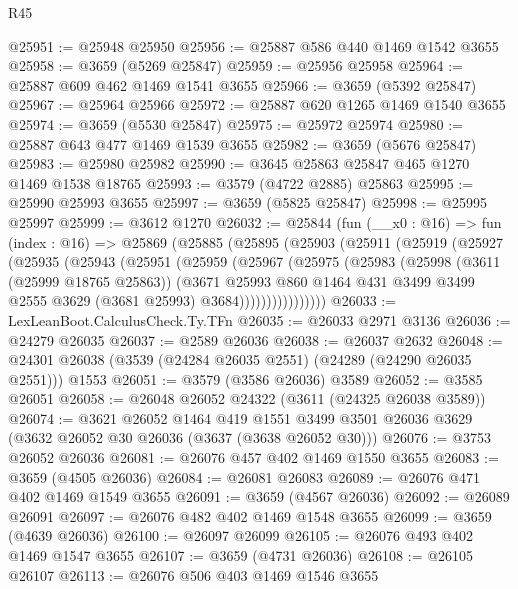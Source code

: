 \begin{lexlean}{R45}
\begin{coremodule}
@25951 := @25948 @25950
@25956 := @25887 @586 @440 @1469 @1542 @3655
@25958 := @3659 (@5269 @25847)
@25959 := @25956 @25958
@25964 := @25887 @609 @462 @1469 @1541 @3655
@25966 := @3659 (@5392 @25847)
@25967 := @25964 @25966
@25972 := @25887 @620 @1265 @1469 @1540 @3655
@25974 := @3659 (@5530 @25847)
@25975 := @25972 @25974
@25980 := @25887 @643 @477 @1469 @1539 @3655
@25982 := @3659 (@5676 @25847)
@25983 := @25980 @25982
@25990 := @3645 @25863 @25847 @465 @1270 @1469 @1538 @18765
@25993 := @3579 (@4722 @2885) @25863
@25995 := @25990 @25993 @3655
@25997 := @3659 (@5825 @25847)
@25998 := @25995 @25997
@25999 := @3612 @1270
@26032 := @25844
    (fun (__x0 : @16) =>
    fun (index : @16) =>
    @25869
      (@25885
        (@25895
          (@25903
            (@25911
              (@25919
                (@25927
                  (@25935
                    (@25943
                      (@25951
                        (@25959
                          (@25967
                            (@25975
                              (@25983
                                (@25998
                                  (@3611 (@25999 @18765 @25863))
                                  (@3671
                                    @25993
                                    @860
                                    @1464
                                    @431
                                    @3499
                                    @3499
                                    @2555
                                    @3629
                                    (@3681 @25993)
                                    @3684))))))))))))))))
@26033 := LexLeanBoot.CalculusCheck.Ty.TFn
@26035 := @26033 @2971 @3136
@26036 := @24279 @26035
@26037 := @2589 @26036
@26038 := @26037 @2632
@26048 := @24301 @26038 (@3539 (@24284 @26035 @2551) (@24289 (@24290 @26035 @2551))) @1553
@26051 := @3579 (@3586 @26036) @3589
@26052 := @3585 @26051
@26058 := @26048 @26052 @24322 (@3611 (@24325 @26038 @3589))
@26074 := @3621
    @26052
    @1464
    @419
    @1551
    @3499
    @3501
    @26036
    @3629
    (@3632 @26052 @30 @26036 (@3637 (@3638 @26052 @30)))
@26076 := @3753 @26052 @26036
@26081 := @26076 @457 @402 @1469 @1550 @3655
@26083 := @3659 (@4505 @26036)
@26084 := @26081 @26083
@26089 := @26076 @471 @402 @1469 @1549 @3655
@26091 := @3659 (@4567 @26036)
@26092 := @26089 @26091
@26097 := @26076 @482 @402 @1469 @1548 @3655
@26099 := @3659 (@4639 @26036)
@26100 := @26097 @26099
@26105 := @26076 @493 @402 @1469 @1547 @3655
@26107 := @3659 (@4731 @26036)
@26108 := @26105 @26107
@26113 := @26076 @506 @403 @1469 @1546 @3655

\end{coremodule}
\end{lexlean}
